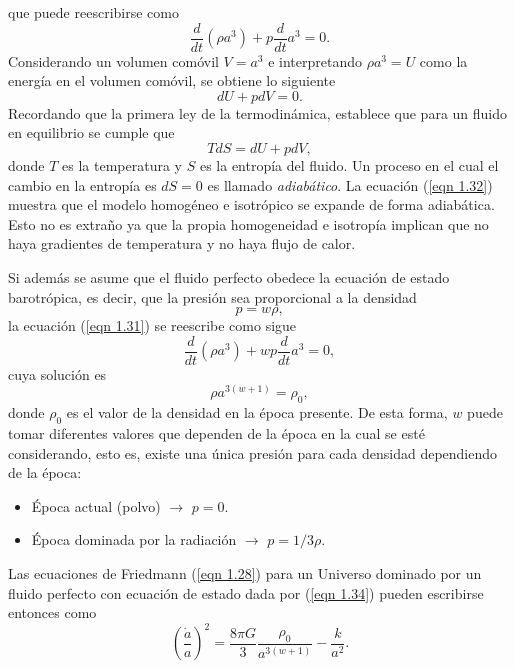 \documentclass[a4paper,openright,12pt]{book}
\begin{document}
que puede reescribirse como
\begin{equation}
\frac{d}{dt} (\rho a^{3}) + p\frac{d}{dt}a^{3} = 0.\label{eqn 1.31}
\end{equation}
Considerando un volumen comóvil $V = a^{3}$ e interpretando $\rho a^{3} = U$ como la energía en el volumen comóvil, se obtiene lo siguiente
\begin{equation}
dU + pdV = 0. \label{eqn 1.32}
\end{equation}
Recordando que la primera ley de la termodinámica, establece que para un fluido en equilibrio se cumple que 
\begin{equation}
TdS = dU +pdV, \label{eqn 1.33}
\end{equation}
donde $T$ es la temperatura y $S$ es la entropía del fluido. Un proceso en el cual el cambio en la entropía es $dS = 0$ es llamado \textit{adiabático}. La ecuación (\ref{eqn 1.32}) muestra que el modelo homogéneo e isotrópico se expande de forma adiabática. Esto no es extraño ya que la propia homogeneidad e isotropía implican que no haya gradientes de temperatura y no haya flujo de calor.

Si además se asume que el fluido perfecto obedece la ecuación de estado barotrópica, es decir, que la presión sea proporcional a la densidad
\begin{equation}
p = w\rho, \label{eqn 1.34}
\end{equation}
la ecuación (\ref{eqn 1.31}) se reescribe como sigue
\begin{equation}
\frac{d}{dt}(\rho a^{3}) + w p \frac{d}{dt} a^{3} = 0,\label{eqn 1.35}
\end{equation}
cuya solución es
\begin{equation}
\rho a^{3(w + 1)} = \rho _{0}, \label{eqn 1.36}
\end{equation}
donde $\rho _{0}$ es el valor de la densidad en la época presente. De esta forma, $w$ puede tomar diferentes valores que dependen de la época en la cual se esté considerando, esto es, existe una única presión para cada densidad dependiendo de la época:
\begin{itemize}
\item Época actual (polvo) $\rightarrow$ $p=0$.
\item Época dominada por la radiación $\rightarrow$ $p = 1/3 \rho$.
\end{itemize}

Las ecuaciones de Friedmann (\ref{eqn 1.28}) para un Universo dominado por un fluido perfecto con ecuación de estado dada por (\ref{eqn 1.34}) pueden escribirse entonces como
\begin{equation}
\left(\frac{\dot{a}}{a}\right)^{2}
=
\frac{8 \pi G}{3} \frac{\rho _{0}}{a^{3(w + 1)}} - \frac{k}{a^{2}}.\label{eqn 1.37}
\end{equation}
\end{document}
